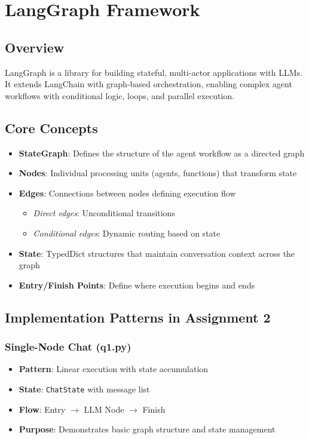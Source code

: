 \documentclass[11pt]{article}
\begin{document}
\section{LangGraph Framework}
\subsection{Overview}
LangGraph is a library for building stateful, multi-actor applications with LLMs. It extends LangChain with graph-based orchestration, enabling complex agent workflows with conditional logic, loops, and parallel execution.

\subsection{Core Concepts}
\begin{itemize}[leftmargin=2em]
    \item \textbf{StateGraph}: Defines the structure of the agent workflow as a directed graph
    \item \textbf{Nodes}: Individual processing units (agents, functions) that transform state
    \item \textbf{Edges}: Connections between nodes defining execution flow
    \begin{itemize}
        \item \textit{Direct edges}: Unconditional transitions
        \item \textit{Conditional edges}: Dynamic routing based on state
    \end{itemize}
    \item \textbf{State}: TypedDict structures that maintain conversation context across the graph
    \item \textbf{Entry/Finish Points}: Define where execution begins and ends
\end{itemize}

\subsection{Implementation Patterns in Assignment 2}
\subsubsection{Single-Node Chat (q1.py)}
\begin{itemize}[leftmargin=2em]
    \item \textbf{Pattern}: Linear execution with state accumulation
    \item \textbf{State}: \texttt{ChatState} with message list
    \item \textbf{Flow}: Entry $\rightarrow$ LLM Node $\rightarrow$ Finish
    \item \textbf{Purpose}: Demonstrates basic graph structure and state management
\end{itemize}
\end{document}
